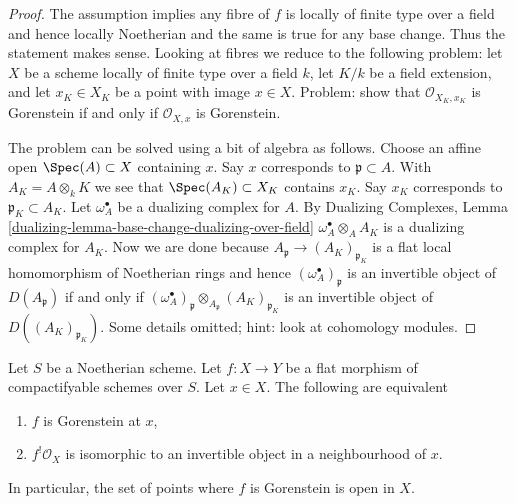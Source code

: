 \begin{proof}
The assumption implies any fibre of $f$ is locally of finite type
over a field and hence locally Noetherian and the same is true for
any base change. Thus the statement makes sense. Looking at
fibres we reduce to the following problem: let $X$ be a scheme
locally of finite type over a field $k$,
let $K/k$ be a field extension, and
let $x_K \in X_K$ be a point with image $x \in X$.
Problem: show that $\mathcal{O}_{X_K, x_K}$ is Gorenstein if and only if
$\mathcal{O}_{X, x}$ is Gorenstein.

\medskip\noindent
The problem can be solved using a bit of algebra as follows.
Choose an affine open $\Spec(A) \subset X$ containing $x$.
Say $x$ corresponds to $\mathfrak p \subset A$.
With $A_K = A \otimes_k K$ we see that $\Spec(A_K) \subset X_K$
contains $x_K$. Say $x_K$ corresponds to $\mathfrak p_K \subset A_K$.
Let $\omega_A^\bullet$ be a dualizing complex for $A$.
By Dualizing Complexes, Lemma
\ref{dualizing-lemma-base-change-dualizing-over-field}
$\omega_A^\bullet \otimes_A A_K$ is a dualizing complex for $A_K$.
Now we are done because
$A_\mathfrak p \to (A_K)_{\mathfrak p_K}$ is a flat local
homomorphism of Noetherian rings and hence
$(\omega_A^\bullet)_\mathfrak p$ is an invertible object
of $D(A_\mathfrak p)$ if and only if
$(\omega_A^\bullet)_\mathfrak p \otimes_{A_\mathfrak p} (A_K)_{\mathfrak p_K}$
is an invertible object of $D((A_K)_{\mathfrak p_K})$.
Some details omitted; hint: look at cohomology modules.
\end{proof}

\begin{lemma}
\label{lemma-affine-flat-Noetherian-gorenstein}
Let $S$ be a Noetherian scheme. Let $f : X \to Y$ be a flat
morphism of compactifyable schemes over $S$. Let $x \in X$.
The following are equivalent
\begin{enumerate}
\item $f$ is Gorenstein at $x$,
\item $f^!\mathcal{O}_X$ is isomorphic to an invertible object
in a neighbourhood of $x$.
\end{enumerate}
In particular, the set of points where $f$ is Gorenstein is
open in $X$.
\end{lemma}

